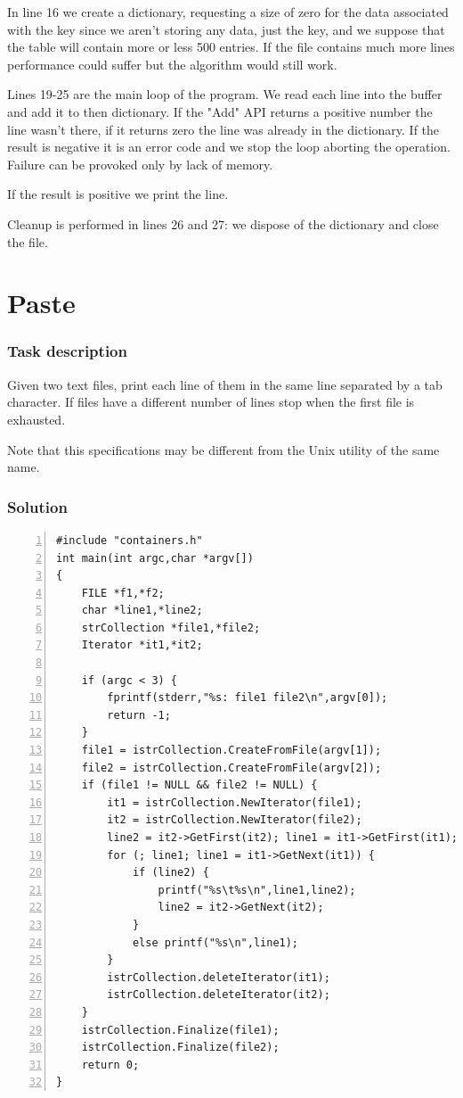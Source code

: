 \documentclass[12pt,a4paper]{memoir} %
\begin{document}
{{In line 16 we create a dictionary, requesting a size of zero for the
data associated with the key since we aren't storing any data, just the
key, and we suppose that the table will contain more or less 500
entries. If the file contains much more lines performance could
suffer but the algorithm would still work.

Lines 19-25 are the main loop of the program. We read each line into
the buffer and add it to then dictionary. If the "Add" API returns
a positive number the line wasn't there, if it returns zero the
line was already in the dictionary. If the result is negative it
is an error code and we stop the loop aborting the operation. Failure
can be provoked only by lack of memory.

If the result is positive we print the line.

Cleanup is performed in lines 26 and 27: we dispose of the dictionary
and close the file.

\section{Paste}
\subsubsection{Task description}
Given two text files, print each line of them in the same line separated by a tab character. If files have a different number of lines
stop when the first file is exhausted.

Note that this specifications may be different from the Unix utility of the same name.
\subsubsection{Solution}
\begin{Verbatim}[numbers=left]
#include "containers.h"
int main(int argc,char *argv[])
{
    FILE *f1,*f2;
    char *line1,*line2;
    strCollection *file1,*file2;
    Iterator *it1,*it2;
  
    if (argc < 3) {
        fprintf(stderr,"%s: file1 file2\n",argv[0]);
        return -1;
    }
    file1 = istrCollection.CreateFromFile(argv[1]);
    file2 = istrCollection.CreateFromFile(argv[2]);
    if (file1 != NULL && file2 != NULL) {
        it1 = istrCollection.NewIterator(file1);
        it2 = istrCollection.NewIterator(file2);
        line2 = it2->GetFirst(it2); line1 = it1->GetFirst(it1);
        for (; line1; line1 = it1->GetNext(it1)) {
            if (line2) {
                printf("%s\t%s\n",line1,line2);
                line2 = it2->GetNext(it2);
            }
            else printf("%s\n",line1);
        }
        istrCollection.deleteIterator(it1);
        istrCollection.deleteIterator(it2);
    }
    istrCollection.Finalize(file1);
    istrCollection.Finalize(file2);
    return 0;
}
\end{Verbatim}
}}
\end{document}

